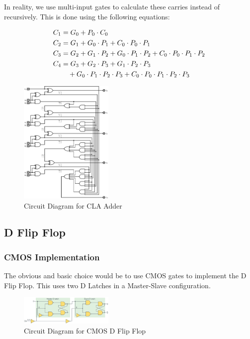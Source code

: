 \documentclass[conference]{IEEEtran}
\begin{document}
In reality, we use multi-input gates to calculate these carries instead of recursively. This is done using the following equations:

\begin{align}
    C_1 &= G_0 + P_0 \cdot C_0 \\
    C_2 &= G_1 + G_0 \cdot P_1 + C_0 \cdot P_0 \cdot P_1 \\
    C_3 &= G_2 + G_1 \cdot P_2 + G_0 \cdot P_1 \cdot P_2 + C_0 \cdot P_0 \cdot P_1 \cdot P_2 \\
    C_4 &= G_3 + G_2 \cdot P_3 + G_1 \cdot P_2 \cdot P_3 \notag \\
        &\quad + G_0 \cdot P_1 \cdot P_2 \cdot P_3 + C_0 \cdot P_0 \cdot P_1 \cdot P_2 \cdot P_3
\end{align}

\begin{figure}[H]
    \centering
    \includegraphics[width=0.4\textwidth]{images/cla_adder_circuit_diagram.png}
    \caption{Circuit Diagram for CLA Adder}
    \label{fig:cla}
\end{figure}


\subsection{D Flip Flop}

\subsubsection{CMOS Implementation}

The obvious and basic choice would be to use CMOS gates to implement the D Flip Flop. This uses two D Latches in a Master-Slave configuration.

\begin{figure}[H]
    \centering
    \includegraphics[width=0.4\textwidth]{images/d_ff_cmos_circuit_diagram.png}
    \caption{Circuit Diagram for CMOS D Flip Flop}
\end{figure}
\end{document}
